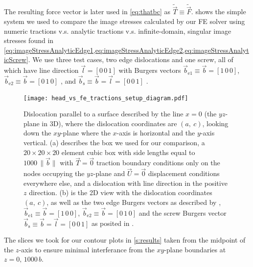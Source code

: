 \documentclass[11pt]{iopart}
\begin{document}
The resulting force vector is later used in \cref{eq:thatbc} as $\tilde{\vec{T}} \equiv \tilde{\vec{F}}$.  shows the simple system we used to compare the image stresses calculated by our FE solver using numeric tractions v.s. analytic tractions v.s. infinite-domain, singular image stresses found in \cref{eq:imageStressAnalyticEdge1,eq:imageStressAnalyticEdge2,eq:imageStressAnalyticScrew}. We use three test cases, two edge dislocations and one screw, all of which have line direction $\vec{l} = [0\, 0\, 1]$ with Burgers vectors $\vec{b}_\textrm{e1} \equiv \vec{b} = [1\, 0\, 0]$, $\vec{b}_\textrm{e2} \equiv \vec{b} = [0\, 1\, 0]$ \cite{head1953edge}, and $\vec{b}_\textrm{s} \equiv \vec{b} = \vec{l} = [0\, 0\, 1] $ \cite{hirth1983theory}.
\begin{figure}
    \centering
    \texttt{[image: head\_vs\_fe\_tractions\_setup\_diagram.pdf]}
    \caption{Dislocation parallel to a surface described by the line $x = 0$ (the $yz$-plane in 3D), where the dislocation coordinates are $(a,~c)$, looking down the $xy$-plane where the $x$-axis is horizontal and the $y$-axis vertical. (a) describes the box we used for our comparison, a  $20 \times 20 \times 20$ element cubic box with side lengths equal to $1000\, \lVert \vec{b} \rVert$ with $\vec{T} = \vec{0}$ traction boundary conditions only on the nodes occupying the $yz$-plane and $\vec{U} = \vec{0}$ displacement conditions everywhere else, and a dislocation with line direction in the positive $z$ direction. (b) is the 2D view with the dislocation coordinates $(a,~c)$, as well as the two edge Burgers vectors as described by \cite{head1953edge}, $\vec{b}_\textrm{e1} \equiv \vec{b} = [1\, 0\, 0]$, $\vec{b}_\textrm{e2} \equiv \vec{b} = [0\, 1\, 0]$ and the screw Burgers vector $\vec{b}_\textrm{s} \equiv \vec{b} = \vec{l} = [0\, 0\, 1] $ as posited in \cite{hirth1983theory}.}
    \label{f:headvstractionfem}
\end{figure}
The slices we took for our contour plots in \cref{s:results} taken from the midpoint of the $z$-axis to ensure minimal interferance from the $xy$-plane boundaries at $z=0,\, 1000\,b$.
\end{document}
